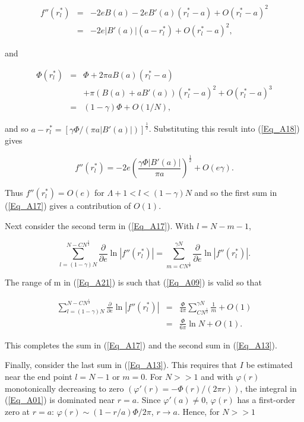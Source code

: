 \documentclass[a4paper,twocolumn,showpacs,preprintnumbers,amsmath,amssymb]{revtex4}
\newcommand{\half}{\frac{1}{2}}
\newcommand{\pdo}[1]{\ensuremath{\frac{\partial }
        {\partial #1 }}}
\begin{document}
\begin{eqnarray}
\nonumber
f''(r^{*}_l)
  &=& -2eB(a) - 2eB'(a) (r^{*}_l - a) + O(r^{*}_l - a)^2\\
\label{Eq_A18}
  &=& -2 e|B'(a)|(a - r^{*}_l) + O(r^{*}_l - a)^2,
\end{eqnarray}

\noindent
and

\begin{eqnarray}
\nonumber
\Phi(r^{*}_l)
  &=& \Phi + 2\pi a B(a) (r^{*}_l - a)\\
\nonumber
  & &  + \pi(B(a) + aB'(a)) (r^{*}_l - a)^2 + O(r^{*}_l - a)^3\\
\label{Eq_A19}
  &=& (1 - \gamma) \Phi + O(1/N),
\end{eqnarray}

\noindent
and so $a - r^{*}_l = [\gamma\Phi / (\pi a|B'(a)|)]^{\half}$.
Substituting this result into (\ref{Eq_A18}) gives

\begin{equation}
\label{Eq_A20}
f''(r^{*}_l)
  = -2 e \left(\frac{\gamma\Phi|B'(a)|}{\pi a}\right)^{\half}
    +O(e\gamma).
\end{equation}

\noindent
Thus $f''(r^{*}_l) = O(e)$ for $\Lambda + 1 < l < (1 - \gamma)N$ and
so the first sum in (\ref{Eq_A17}) gives a contribution of $O(1)$.

Next consider the second term in (\ref{Eq_A17}). With $l = N-m-1$,


\begin{equation}
\label{Eq_A21}
\sum^{N-CN^{\frac{1}{3}}}_{l=(1-\gamma)N} \pdo{e} \ln |f''(r^{*}_l)|
  = \sum^{\gamma N}_{m = CN^{\frac{1}{3}}}  \pdo{e} \ln |f''(r^{*}_l)|.
\end{equation}

\noindent
The range of m in (\ref{Eq_A21}) is such that (\ref{Eq_A09}) is valid
so that

\begin{eqnarray}
\nonumber
\sum^{N-CN^{\frac{1}{3}}}_{l=(1-\gamma)N}\pdo{e} \ln |f''(r^{*}_l)|
  &=& \frac{\Phi}{4 \pi} \sum^{\gamma N}_{CN^{\frac{1}{3}}}
      \frac{1}{m} + O(1)\\
\label{Eq_A22}
  &=& \frac{\Phi}{6 \pi} \ln N + O(1).
\end{eqnarray}

\noindent
This completes the sum in (\ref{Eq_A17}) and the second sum in
(\ref{Eq_A13}).

Finally, consider the last sum in (\ref{Eq_A13}). This requires that
$I$ be estimated near the end point $l=N-1$ or $m=0$. For $N>>1$ and
with $\varphi(r)$ monotonically decreasing to zero
$(\varphi'(r) = -\Phi(r) / (2\pi r))$, the integral in (\ref{Eq_A01})
is dominated near $r = a$. Since $\varphi'(a) \neq 0$, $\varphi(r)$ has
a first-order zero at $r = a$: $\varphi(r) \sim (1-r/a)\Phi/2\pi$,
$r \to a$. Hence, for $N >> 1$
\end{document}
